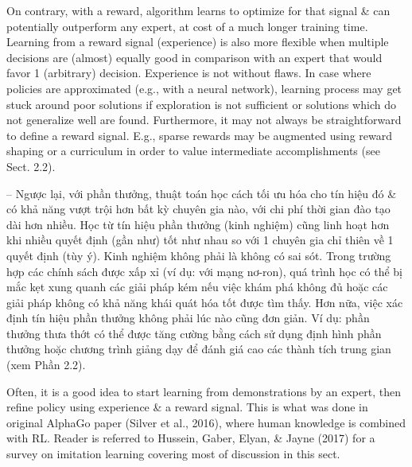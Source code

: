 \documentclass{article}
\begin{document}
\begin{itemize}
\begin{itemize}
        On contrary, with a reward, algorithm learns to optimize for that signal \& can potentially outperform any expert, at cost of a much longer training time. Learning from a reward signal (experience) is also more flexible when multiple decisions are (almost) equally good in comparison with an expert that would favor 1 (arbitrary) decision. Experience is not without flaws. In case where policies are approximated (e.g., with a neural network), learning process may get stuck around poor solutions if exploration is not sufficient or solutions which do not generalize well are found. Furthermore, it may not always be straightforward to define a reward signal. E.g., sparse rewards may be augmented using reward shaping or a curriculum in order to value intermediate accomplishments (see Sect. 2.2).

        -- Ngược lại, với phần thưởng, thuật toán học cách tối ưu hóa cho tín hiệu đó \& có khả năng vượt trội hơn bất kỳ chuyên gia nào, với chi phí thời gian đào tạo dài hơn nhiều. Học từ tín hiệu phần thưởng (kinh nghiệm) cũng linh hoạt hơn khi nhiều quyết định (gần như) tốt như nhau so với 1 chuyên gia chỉ thiên về 1 quyết định (tùy ý). Kinh nghiệm không phải là không có sai sót. Trong trường hợp các chính sách được xấp xỉ (ví dụ: với mạng nơ-ron), quá trình học có thể bị mắc kẹt xung quanh các giải pháp kém nếu việc khám phá không đủ hoặc các giải pháp không có khả năng khái quát hóa tốt được tìm thấy. Hơn nữa, việc xác định tín hiệu phần thưởng không phải lúc nào cũng đơn giản. Ví dụ: phần thưởng thưa thớt có thể được tăng cường bằng cách sử dụng định hình phần thưởng hoặc chương trình giảng dạy để đánh giá cao các thành tích trung gian (xem Phần 2.2).

        Often, it is a good idea to start learning from demonstrations by an expert, then refine policy using experience \& a reward signal. This is what was done in original AlphaGo paper (Silver et al., 2016), where human knowledge is combined with RL. Reader is referred to Hussein, Gaber, Elyan, \& Jayne (2017) for a survey on imitation learning covering most of discussion in this sect.


\end{itemize}
\end{itemize}
\end{document}
